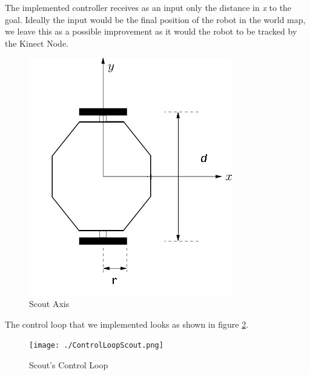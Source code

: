 The implemented controller receives as an input only the distance in \textit{x} to the goal. Ideally the input would be the final position of the robot in the world map, we leave this as a possible improvement as it would the robot to be tracked by the Kinect Node.

\begin{figure}[!ht]
    \centering
    \includegraphics[width=0.5\columnwidth]{./ScoutAxis.png}
    \caption{Scout Axis}
    \label{fig:scout_axis}
\end{figure}

The control loop that we implemented looks as shown in figure \ref{fig:scout_loop}.

\begin{figure}[!ht]
    \centering
    \texttt{[image: ./ControlLoopScout.png]}
    \caption{Scout's Control Loop}
    \label{fig:scout_loop}
\end{figure}
